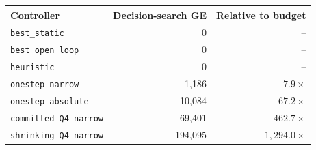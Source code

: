 \begin{tabular}{lrr}
\toprule
Controller & Decision-search GE & Relative to budget \\
\midrule
\texttt{best\_static} & 0 & -- \\
\texttt{best\_open\_loop} & 0 & -- \\
\texttt{heuristic} & 0 & -- \\
\texttt{onestep\_narrow} & 1,186 & $7.9\times$ \\
\texttt{onestep\_absolute} & 10,084 & $67.2\times$ \\
\texttt{committed\_Q4\_narrow} & 69,401 & $462.7\times$ \\
\texttt{shrinking\_Q4\_narrow} & 194,095 & $1,294.0\times$ \\
\bottomrule
\end{tabular}
